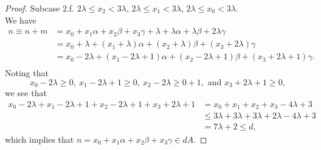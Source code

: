 \begin{proof}
Subcase 2.f. $2\lambda \leq x_2 < 3 \lambda$, $ 2\lambda \leq x_1 < 3\lambda$,  $2\lambda \leq x_0 < 3\lambda$. \\
We have
\begin{align*}
n \equiv n + m &= x_0 + x_1\alpha + x_2\beta + x_3\gamma + \lambda + \lambda \alpha + \lambda \beta + 2 \lambda \gamma\\
&=  x_0 + \lambda + (x_1 + \lambda) \alpha + (x_2 + \lambda) \beta + (x_3 + 2 \lambda) \gamma\\ 
&=  x_0 -  2\lambda + (x_1 - 2 \lambda + 1) \alpha + (x_2 - 2 \lambda + 1) \beta + (x_3 + 2 \lambda + 1)\gamma.\\ 
\end{align*}
Noting that
\[  x_0 -  2\lambda \geq 0,  \ x_1 - 2 \lambda + 1 \geq 0, \  x_2 - 2 \lambda \geq 0 + 1, \text{ and } x_3 + 2 \lambda + 1 \geq 0, \]
we see that 
\begin{align*}
x_0 -  2\lambda + x_1 - 2 \lambda + 1 + x_2  - 2 \lambda + 1 + x_3 + 2 \lambda + 1 &= x_0  + x_1 +  x_2 + x_3 -  4 \lambda + 3 \\
&\leq 3 \lambda + 3 \lambda + 3 \lambda + 2\lambda - 4 \lambda + 3\\
&= 7 \lambda + 2 \leq d,
\end{align*}
which implies that $n = x_0 + x_1\alpha + x_2\beta + x_3\gamma \in dA$. 




\end{proof}

